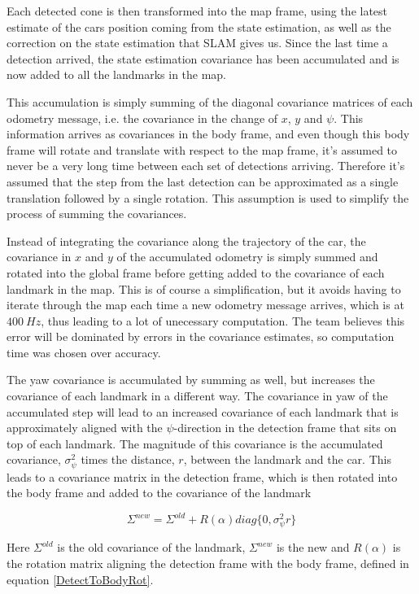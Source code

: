 Each detected cone is then transformed into the map frame, using the latest estimate of the cars position coming from the state estimation, as well as the correction on the state estimation that SLAM gives us. Since the last time a detection arrived, the state estimation covariance has been accumulated and is now added to all the landmarks in the map. 

This accumulation is simply summing of the diagonal covariance matrices of each odometry message, i.e. the covariance in the change of $x$, $y$ and $\psi$. This information arrives as covariances in the body frame, and even though this body frame will rotate and translate with respect to the map frame, it's assumed to never be a very long time between each set of detections arriving. Therefore it's assumed that the step from the last detection can be approximated as a single translation followed by a single rotation. This assumption is used to simplify the process of summing the covariances. 

Instead of integrating the covariance along the trajectory of the car, the covariance in $x$ and $y$ of the accumulated odometry is simply summed and rotated into the global frame before getting added to the covariance of each landmark in the map. This is of course a simplification, but it avoids having to iterate through the map each time a new odometry message arrives, which is at $\SI{400}{Hz}$, thus leading to a lot of unecessary computation. The team believes this error will be dominated by errors in the covariance estimates, so computation time was chosen over accuracy. 

The yaw covariance is accumulated by summing as well, but increases the covariance of each landmark in a different way. The covariance in yaw of the accumulated step will lead to an increased covariance of each landmark that is approximately aligned with the $\psi$-direction in the detection frame that sits on top of each landmark. The magnitude of this covariance is the accumulated covariance, $\sigma_{\psi}^2$ times the distance, $r$, between the landmark and the car. This leads to a covariance matrix in the detection frame, which is then rotated into the body frame and added to the covariance of the landmark

\begin{equation}
    \Sigma^{new} = \Sigma^{old} + R(\alpha)diag\{0,\sigma^2_{\psi}r\}
\end{equation}

Here $\Sigma^{old}$ is the old covariance of the landmark, $\Sigma^{new}$ is the new and $R(\alpha)$ is the rotation matrix aligning the detection frame with the body frame, defined in equation \ref{DetectToBodyRot}. 

